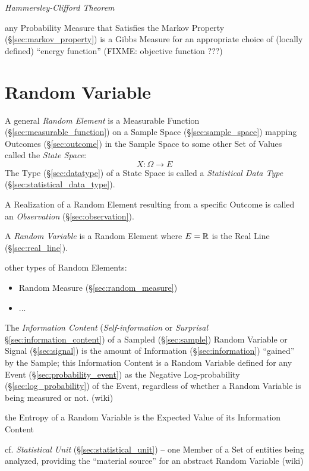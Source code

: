 \emph{Hammersley-Clifford Theorem}

any Probability Measure that Satisfies the Markov Property
(\S\ref{sec:markov_property}) is a Gibbs Measure for an appropriate choice of
(locally defined) ``energy function'' (FIXME: objective function ???)



\section{Random Variable}\label{sec:random_variable}

A general \emph{Random Element} is a Measurable Function
(\S\ref{sec:measurable_function}) on a Sample Space (\S\ref{sec:sample_space})
mapping Outcomes (\S\ref{sec:outcome}) in the Sample Space to some other Set of
Values called the \emph{State Space}:
\[
  X : \Omega \to E
\]
The Type (\S\ref{sec:datatype}) of a State Space is called a \emph{Statistical
  Data Type} (\S\ref{sec:statistical_data_type}).

A Realization of a Random Element resulting from a specific Outcome is called an
\emph{Observation} (\S\ref{sec:observation}).

A \emph{Random Variable} is a Random Element where $E = \mathbb{R}$ is the Real Line
(\S\ref{sec:real_line}).

other types of Random Elements:
\begin{itemize}
  \item Random Measure (\S\ref{sec:random_measure})
  \item ...
\end{itemize}

The \emph{Information Content} (\emph{Self-information} or \emph{Surprisal}
\S\ref{sec:information_content}) of a Sampled (\S\ref{sec:sample}) Random
Variable or Signal (\S\ref{sec:signal}) is the amount of Information
(\S\ref{sec:information}) ``gained'' by the Sample; this Information Content is
a Random Variable defined for any Event (\S\ref{sec:probability_event}) as the
Negative Log-probability (\S\ref{sec:log_probability}) of the Event,
regardless of whether a Random Variable is being measured or not. (wiki)

the Entropy of a Random Variable is the Expected Value of its Information
Content

\fist cf. \emph{Statistical Unit} (\S\ref{sec:statistical_unit}) -- one Member
of a Set of entities being analyzed, providing the ``material source'' for an
abstract Random Variable (wiki)

